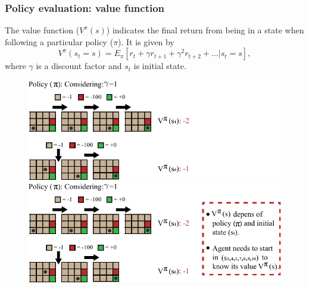 \begin{frame}
	\frametitle{Policy evaluation: value function}
	The value function ($V^{\pi}(s)$) indicates the final return from being in a state when following a particular policy ($\pi$)\footnotemark[1]. It is given by
	\begin{equation*}
		V^{\pi}(s_t= s) = E_{\pi}  \left[r_t + \gamma r_{t+1} + \gamma^{2} r_{t+2}+ . . . | s_t = s \right],
	\end{equation*}
	\noindent where $\gamma$ is a discount factor and $s_t$ is initial state.
	
	\begin{figure}
		\begin{overprint}
			\includegraphics{policy_selection_v3_1.pdf}
			\onslide<2>\includegraphics{policy_selection_v3.pdf}
		\end{overprint}
	\end{figure}

\end{frame}

